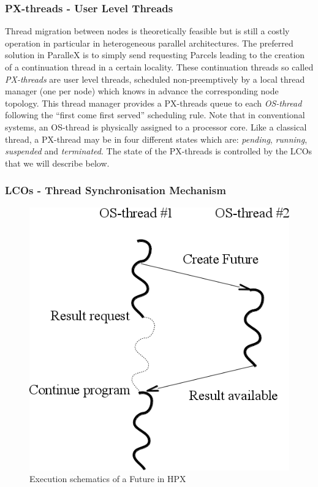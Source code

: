 \documentclass[smallextended]{svjour3}
\begin{document}
\subsubsection{PX-threads - User Level Threads}
Thread migration between nodes is theoretically feasible but is still a costly operation in particular in heterogeneous parallel architectures. The preferred solution in ParalleX is to simply send requesting Parcels leading to the creation of a continuation thread in a certain locality. These continuation threads so called \emph{PX-threads} \cite{ParalleX} are user level threads, scheduled non-preemptively by a local thread manager (one per node) which knows in advance the corresponding node topology. This thread manager provides a PX-threads queue to each \emph{OS-thread} \cite{ParalleX} following the \enquote{first come first served} scheduling rule. Note that in conventional systems, an OS-thread is physically assigned to a processor core. Like a classical thread, a PX-thread may be in four different states which are: \emph{pending}, \emph{running}, \emph{suspended} and \emph{terminated}. The state of the PX-threads is controlled by the LCOs that we will describe below.

\subsubsection{LCOs - Thread Synchronisation Mechanism}\label{lcos}

\begin{figure}[h]
\begin{center}
\includegraphics[scale=0.4]{Images/Im5.png}
\end{center}
\caption{Execution schematics of a Future in HPX}
\label{hpxthread}
\end{figure}
\end{document}
